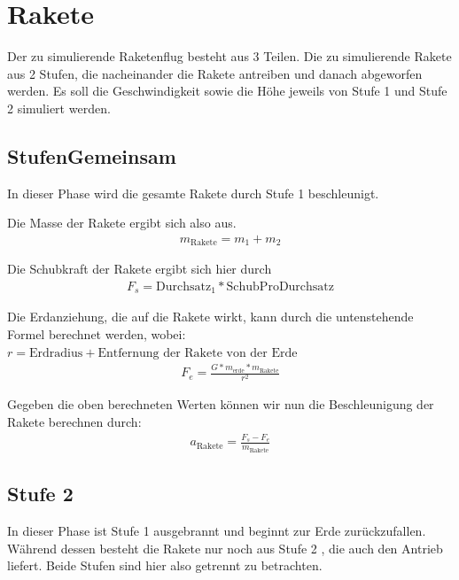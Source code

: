 \documentclass[10pt]{scrartcl}
\author{Oliver Steenbuck, Karolina Bernat}
\title{\titletext}
\date{12.12.2012}
\begin{document}
\maketitle
\setcounter{tocdepth}{3}
\tableofcontents
\listoffigures
\lstlistoflistings


\section{Rakete}
	Der zu simulierende Raketenflug besteht aus 3 Teilen. Die zu simulierende Rakete aus 2 Stufen, die nacheinander die Rakete antreiben und danach abgeworfen werden.
	Es soll die Geschwindigkeit sowie die Höhe jeweils von Stufe 1 und Stufe 2 simuliert werden.
	

	\subsection{StufenGemeinsam} \label{sec:stufenGemeinsam}
	In dieser Phase wird die gesamte Rakete durch Stufe 1 beschleunigt.
	
	Die Masse der Rakete ergibt sich also aus.
	\begin{align} 
	m_{\text{Rakete}} = m_1 + m_2
	\end{align}

	Die Schubkraft der Rakete ergibt sich hier durch
	\begin{align}
	F_s = \text{Durchsatz}_1 * \text{SchubProDurchsatz}
	\end{align}

	Die Erdanziehung, die auf die Rakete wirkt, kann durch die untenstehende Formel berechnet werden, wobei:\\ $r = \text{Erdradius} + \text{Entfernung der Rakete von der Erde}$
	\begin{align}
	F_e = \frac{G * m_{\text{erde}} * m_{\text{Rakete}}}{r^2}
	\end{align}
	
	Gegeben die oben berechneten Werten können wir nun die Beschleunigung der Rakete berechnen durch:
	\begin{align}
	a_{\text{Rakete}} = \frac{F_s - F_e}{m_{\text{Rakete}}}
	\end{align}
	
	\subsection{Stufe 2}
	In dieser Phase ist Stufe 1 ausgebrannt und beginnt zur Erde zurückzufallen. Während dessen besteht die Rakete nur noch aus Stufe 2 , die auch den Antrieb liefert. Beide Stufen sind hier also getrennt zu betrachten.
	
\end{document}
